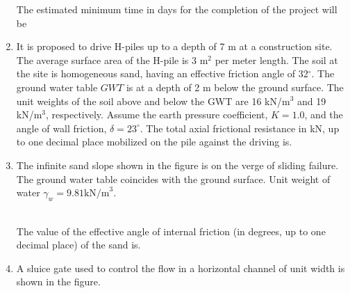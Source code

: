 \documentclass[journal]{IEEEtran}
\numberwithin{equation}{enumi}
\numberwithin{figure}{enumi}
\begin{document}
\begin{enumerate}[start=40]
The estimated minimum time in days for the completion of the project will be

\item
It is proposed to drive H-piles up to a depth of 7 m at a construction site. The average surface area of the H-pile is 3 m$^2$ per meter length. The soil at the site is homogeneous sand, having an effective friction angle of 32$^\circ$. The ground water table $GWT$ is at a depth of 2 m below the ground surface. The unit weights of the soil above and below the GWT are 16 kN/m$^3$ and 19 kN/m$^3$, respectively. Assume the earth pressure coefficient, $K = 1.0$, and the angle of wall friction, $\delta = 23^\circ$. The total axial frictional resistance in kN, up to one decimal place mobilized on the pile against the driving is.

\item
The infinite sand slope shown in the figure is on the verge of sliding failure. The ground water table coincides with the ground surface. Unit weight of water $\gamma_w = 9.81 \text{kN/m}^3$.
\begin{figure}[!ht]
\centering
{}%

\label{fig:my_label}
\end{figure}\\
The value of the effective angle of internal friction (in degrees, up to one decimal place) of the sand is.

\item
A sluice gate used to control the flow in a horizontal channel of unit width is shown in the figure.\\
\end{enumerate}
\end{document}
